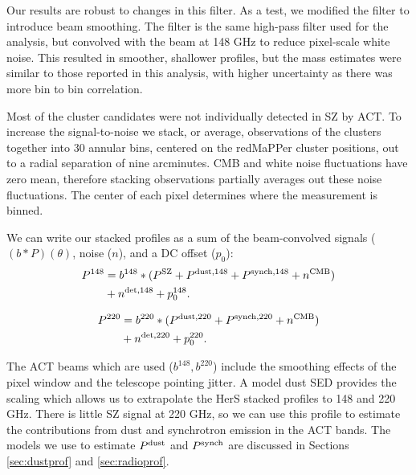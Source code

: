 \documentclass[a4paper,fleqn,usenatbib]{mnras}
\begin{document}
Our results are robust to changes in this filter.  As a test, we modified the filter to introduce beam smoothing.  The filter is the same high-pass filter used for the analysis, but convolved with the beam at 148 GHz to reduce pixel-scale white noise. 
This resulted in smoother, shallower profiles, but the mass estimates were similar to those reported in this analysis, with higher uncertainty as there was more bin to bin correlation.

Most of the cluster candidates were not individually detected in SZ by ACT. 
To increase the signal-to-noise we stack, or average, observations of the clusters together into 30 annular bins, centered on the redMaPPer cluster positions, out to a radial separation of nine arcminutes. 
CMB and white noise fluctuations have zero mean, therefore stacking observations partially averages out these noise fluctuations. 
The center of each pixel determines where the measurement is binned.

We can write our stacked profiles as a sum of the beam-convolved signals ($(b \ast P)(\theta)$, noise ($n$), and a DC offset ($p_0$):
\begin{equation}
\begin{split}
      P^{148} & = b^{148} \ast ( P^{\rm SZ} + P^{\rm dust,148} + P^{\rm synch,148} + n^{\rm CMB} ) \\ & + n^{\rm det,148} + p_0^{148}.
\end{split}
\label{eq:prof148}
\end{equation}

\begin{equation}
  \label{eq:prof220}
 \begin{split}
  P^{220} & = b^{220} \ast ( P^{\rm dust,220} + P^{\rm synch,220} + n^{\rm CMB} ) \\ & + n^{\rm det,220} + p_0^{220}.
\end{split}
\end{equation}

The ACT beams which are used ($b^{148}, b^{220}$) include the smoothing effects of the pixel window and the telescope pointing jitter.
A model dust SED provides the scaling which allows us to extrapolate the HerS stacked profiles to 148 and 220 GHz.
There is little SZ signal at 220 GHz, so we can use this profile to estimate the contributions from dust and synchrotron emission in the ACT bands. 
The models we use to estimate $P^{\rm dust}$ and $P^{\rm synch}$ are discussed in Sections \ref{sec:dustprof} and \ref{sec:radioprof}.
\end{document}
